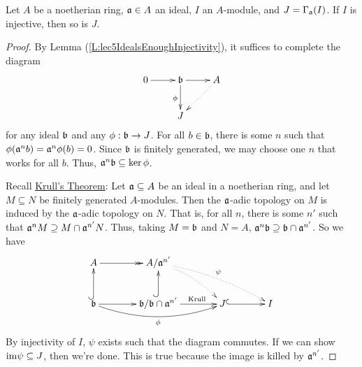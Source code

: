 \begin{lemma}\label{L:lec5lemma2}
 Let $A$ be a noetherian ring, $\mathfrak{a}\in A$ an ideal, $I$
 an $A$-module, and $J=\Gamma_{\mathfrak{a}}(I)$.  If $I$ is
 injective, then so is $J$.
\end{lemma}
\begin{proof}
By Lemma (\ref{L:lec5IdealsEnoughInjectivity}), it suffices to
complete the diagram
\[\xymatrix{
 0\ar[r] & \b \ar[r] \ar[d]_{\phi} & A \ar@{.>}[dl]\\
 & J
 }\]
for any ideal $\mathfrak{b}$ and any $\phi: \mathfrak{b}\to J$. For all $b\in \mathfrak{b}$,
there is some $n$ such that $\phi(\mathfrak{a}^nb) = \mathfrak{a}^n\phi(b)=0$.  Since
$\mathfrak{b}$ is finitely generated, we may choose one $n$ that works for
all $b$. Thus, $\mathfrak{a}^n\mathfrak{b}\subseteq \ker \phi$.

Recall \underline{Krull's Theorem}: Let $\mathfrak{a}\subseteq A$ be an
ideal in a noetherian ring, and let $M\subseteq N$ be finitely
generated $A$-modules.  Then the $\mathfrak{a}$-adic topology on $M$ is
induced by the $\mathfrak{a}$-adic topology on $N$.  That is, for all $n$,
there is some $n'$ such that $\mathfrak{a}^nM\supseteq M\cap \mathfrak{a}^{n'}N$.
Thus, taking $M=\mathfrak{b}$ and $N=A$, $\mathfrak{a}^n\mathfrak{b} \supseteq \mathfrak{b}\cap \mathfrak{a}^{n'}$.
So we have
\[\xymatrix@C=13mm{
 A\ar@{->>}[r] & A/\a^{n'}\ar@{.>}@/^/[dr] \ar@{.>}@/^/[drr]^{\psi}\\
 \b\ar@{^(->}[u]\ar[r] \ar@/_3ex/[rr]_{\phi} & \b/\b\cap \a^{n'}
 \ar@{^(->}[u] \ar[r]^(.6){\text{Krull}} & J \ar@{^(->}[r] & I
 }\]
By injectivity of $I$, $\psi$ exists such that the diagram
commutes.  If we can show $\text{im} \psi \subseteq J$, then we're done.
This is true because the image is killed by $\mathfrak{a}^{n'}$.
\end{proof}

